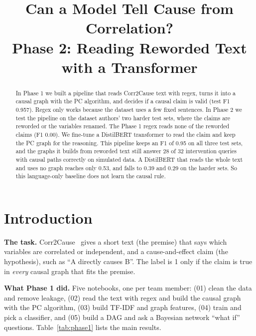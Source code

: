 \documentclass[conference]{IEEEtran}
\begin{document}
\title{Can a Model Tell Cause from Correlation?\\
Phase 2: Reading Reworded Text with a Transformer}

\author{
}

\maketitle

\begin{abstract}
In Phase 1 we built a pipeline that reads Corr2Cause text with regex, turns it into a causal graph with the PC
algorithm, and decides if a causal claim is valid (test F1 0.957). Regex only works because the dataset uses a few
fixed sentences. In Phase 2 we test the pipeline on the dataset authors' two harder test sets, where the claims are
reworded or the variables renamed. The Phase 1 regex reads none of the reworded claims (F1 0.00). We fine-tune a
DistilBERT transformer to read the claim and keep the PC graph for the reasoning. This pipeline keeps an F1 of 0.95
on all three test sets, and the graphs it builds from reworded text still answer 28 of 32 intervention queries with
causal paths correctly on simulated data. A DistilBERT that reads the whole text and uses no graph reaches only 0.53, and falls to 0.39 and 0.29 on
the harder sets. So this language-only baseline does not learn the causal rule.
\end{abstract}

\section{Introduction}
\textbf{The task.} Corr2Cause~\cite{jin2024} gives a short text (the premise) that says which variables are
correlated or independent, and a cause-and-effect claim (the hypothesis), such as ``A directly causes B''. The label
is 1 only if the claim is true in \emph{every} causal graph that fits the premise.

\textbf{What Phase 1 did.} Five notebooks, one per team member: (01) clean the data and remove leakage, (02) read
the text with regex and build the causal graph with the PC algorithm, (03) build TF-IDF and graph features, (04)
train and pick a classifier, and (05) build a DAG and ask a Bayesian network ``what if'' questions.
Table~\ref{tab:phase1} lists the main results.
\end{document}
